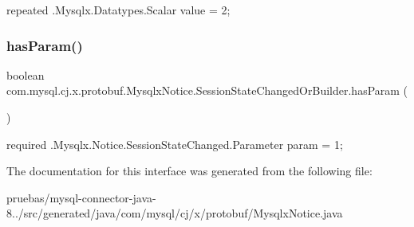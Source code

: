 {\ttfamily repeated .Mysqlx.\+Datatypes.\+Scalar value = 2;} \mbox{\label{interfacecom_1_1mysql_1_1cj_1_1x_1_1protobuf_1_1_mysqlx_notice_1_1_session_state_changed_or_builder_a4487572853d49df81e729383d0412a1b}} 
\subsubsection{\texorpdfstring{has\+Param()}{hasParam()}}
{\footnotesize\ttfamily boolean com.\+mysql.\+cj.\+x.\+protobuf.\+Mysqlx\+Notice.\+Session\+State\+Changed\+Or\+Builder.\+has\+Param (\begin{DoxyParamCaption}{ }\end{DoxyParamCaption})}

{\ttfamily required .Mysqlx.\+Notice.\+Session\+State\+Changed.\+Parameter param = 1;} 

The documentation for this interface was generated from the following file\+:\begin{DoxyCompactItemize}
\item 
pruebas/mysql-\/connector-\/java-\/8../src/generated/java/com/mysql/cj/x/protobuf/Mysqlx\+Notice.\+java\end{DoxyCompactItemize}
